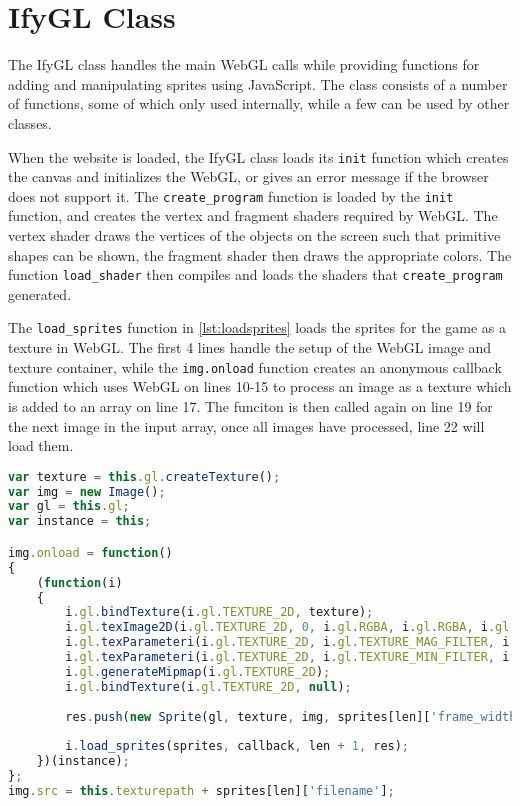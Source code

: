 \section{IfyGL Class}
The IfyGL class handles the main WebGL calls while providing functions for adding and manipulating sprites using JavaScript. The class consists of a number of functions, some of which only used internally, while a few can be used by other classes.\newline

When the website is loaded, the IfyGL class loads its \texttt{init} function which creates the canvas and initializes the WebGL, or gives an error message if the browser does not support it. The \texttt{create\_program} function is loaded by the \texttt{init} function, and creates the vertex and fragment shaders required by WebGL. The vertex shader draws the vertices of the objects on the screen such that primitive shapes can be shown, the fragment shader then draws the appropriate colors. The function \texttt{load\_shader} then compiles and loads the shaders that \texttt{create\_program} generated.\newline

The \texttt{load\_sprites} function in \autoref{lst:loadsprites} loads the sprites for the game as a texture in WebGL. The first 4 lines handle the setup of the WebGL image and texture container, while the \texttt{img.onload} function creates an anonymous callback function which uses WebGL on lines 10-15 to process an image as a texture which is added to an array on line 17. The funciton is then called again on line 19 for the next image in the input array, once all images have processed, line 22 will load them.

\begin{lstlisting}[language=JavaScript, caption=The function \texttt{load\_sprites}, label=lst:loadsprites]
var texture = this.gl.createTexture();
var img = new Image();
var gl = this.gl;
var instance = this;

img.onload = function()
{
	(function(i)
	{
		i.gl.bindTexture(i.gl.TEXTURE_2D, texture);
		i.gl.texImage2D(i.gl.TEXTURE_2D, 0, i.gl.RGBA, i.gl.RGBA, i.gl.UNSIGNED_BYTE, img);
		i.gl.texParameteri(i.gl.TEXTURE_2D, i.gl.TEXTURE_MAG_FILTER, i.gl.LINEAR);
		i.gl.texParameteri(i.gl.TEXTURE_2D, i.gl.TEXTURE_MIN_FILTER, i.gl.LINEAR_MIPMAP_NEAREST);
		i.gl.generateMipmap(i.gl.TEXTURE_2D);
		i.gl.bindTexture(i.gl.TEXTURE_2D, null);
		
		res.push(new Sprite(gl, texture, img, sprites[len]['frame_width'], sprites[len]['frame_height'], sprites[len]['origin']));
		
		i.load_sprites(sprites, callback, len + 1, res);
	})(instance);
};
img.src = this.texturepath + sprites[len]['filename'];
\end{lstlisting}


